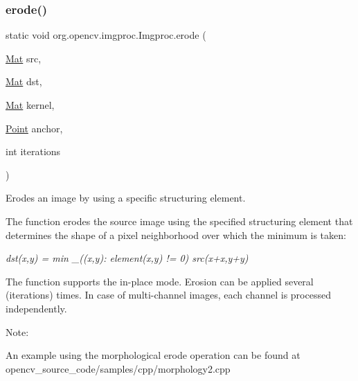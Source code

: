 \subsubsection{\texorpdfstring{erode()}{erode()}\hspace{0.1cm}{\footnotesize\ttfamily [2/3]}}
{\footnotesize\ttfamily static void org.\+opencv.\+imgproc.\+Imgproc.\+erode (\begin{DoxyParamCaption}\item[{\mbox{\hyperlink{classorg_1_1opencv_1_1core_1_1_mat}{Mat}}}]{src,  }\item[{\mbox{\hyperlink{classorg_1_1opencv_1_1core_1_1_mat}{Mat}}}]{dst,  }\item[{\mbox{\hyperlink{classorg_1_1opencv_1_1core_1_1_mat}{Mat}}}]{kernel,  }\item[{\mbox{\hyperlink{classorg_1_1opencv_1_1core_1_1_point}{Point}}}]{anchor,  }\item[{int}]{iterations }\end{DoxyParamCaption})\hspace{0.3cm}{\ttfamily [static]}}

Erodes an image by using a specific structuring element.

The function erodes the source image using the specified structuring element that determines the shape of a pixel neighborhood over which the minimum is taken\+:

{\itshape dst(x,y) = min \+\_\+((x\textquotesingle{},y\textquotesingle{})\+: element(x\textquotesingle{},y\textquotesingle{}) != 0) src(x+x\textquotesingle{},y+y\textquotesingle{})}

The function supports the in-\/place mode. Erosion can be applied several ({\ttfamily iterations}) times. In case of multi-\/channel images, each channel is processed independently.

Note\+:


\begin{DoxyItemize}
\item An example using the morphological erode operation can be found at opencv\+\_\+source\+\_\+code/samples/cpp/morphology2.\+cpp 
\end{DoxyItemize}


